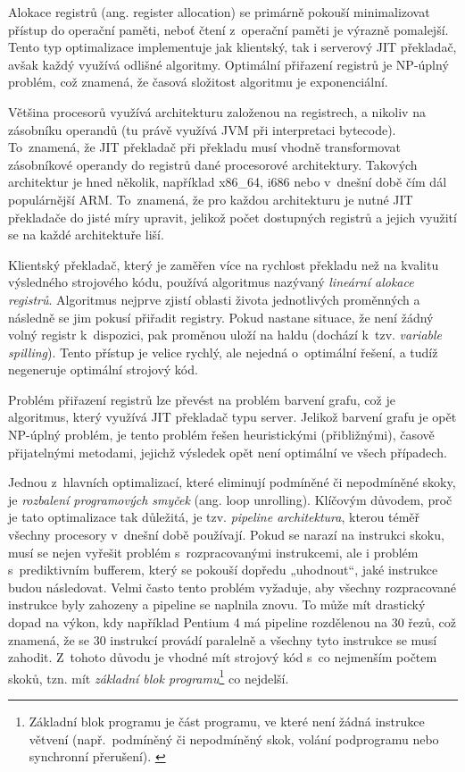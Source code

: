 \documentclass[
  master,
  biblatex,
  figures=true,
  theorems,
  sourcecodes,
  glossaries,
  index
]{kidiplom}
\begin{document}
Alokace registrů (ang. register allocation) se primárně pokouší minimalizovat přístup do operační paměti, neboť čtení z~operační paměti je výrazně pomalejší. Tento typ optimalizace implementuje jak klientský, tak i serverový JIT překladač, avšak každý využívá odlišné algoritmy. Optimální přiřazení registrů je NP-úplný problém, což znamená, že časová složitost algoritmu je exponenciální.

Většina procesorů využívá architekturu založenou na registrech, a nikoliv na zásobníku operandů (tu právě využívá JVM při interpretaci bytecode). To~znamená, že JIT překladač při překladu musí vhodně transformovat zásobníkové operandy do registrů dané procesorové architektury. Takových architektur je hned několik, například x86\_64, i686 nebo v~dnešní době čím dál populárnější ARM. To~znamená, že pro každou architekturu je nutné JIT překladače do jisté míry upravit, jelikož počet dostupných registrů a jejich využití se na každé architektuře liší. 

Klientský překladač, který je zaměřen více na rychlost překladu než na kvalitu výsledného strojového kódu, používá algoritmus nazývaný \textit{lineární alokace registrů}. Algoritmus nejprve zjistí oblasti života jednotlivých proměnných a následně se jim pokusí přiřadit registry. Pokud nastane situace, že není žádný volný registr k~dispozici, pak proměnou uloží na haldu (dochází k~tzv. \textit{variable spilling}). Tento přístup je velice rychlý, ale nejedná o~optimální řešení, a tudíž negeneruje optimální strojový kód. 


Problém přiřazení registrů lze převést na problém barvení grafu, což je algoritmus, který využívá JIT překladač typu server. Jelikož barvení grafu je opět NP-úplný problém, je tento problém řešen heuristickými (přibližnými), časově přijatelnými metodami, jejichž výsledek opět není optimální ve všech případech.

Jednou z~hlavních optimalizací, které eliminují podmíněné či nepodmíněné skoky, je \textit{rozbalení programových smyček} (ang. loop unrolling). Klíčovým důvodem, proč je tato optimalizace tak důležitá, je tzv. \textit{pipeline architektura}, kterou téměř všechny procesory v~dnešní době používají. Pokud se narazí na instrukci skoku, musí se nejen vyřešit problém s~rozpracovanými instrukcemi, ale i problém s~prediktivním bufferem, který se pokouší dopředu „uhodnout“, jaké instrukce budou následovat. Velmi často tento problém vyžaduje, aby všechny rozpracované instrukce byly zahozeny a pipeline se naplnila znovu. To může mít drastický dopad na výkon, kdy například Pentium 4 má pipeline rozdělenou na 30 řezů, což znamená, že se 30 instrukcí provádí paralelně a všechny tyto instrukce se musí zahodit. Z~tohoto důvodu je vhodné mít strojový kód s~co nejmenším počtem skoků, tzn. mít \textit{základní blok programu}\footnote{Základní blok programu je část programu, ve které není žádná instrukce větvení (např.~podmíněný či nepodmíněný skok, volání podprogramu nebo synchronní přerušení). \cite{zakladni-blok-programu}} co nejdelší.
\end{document}
